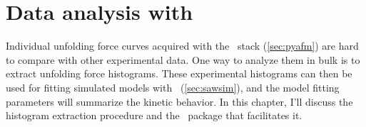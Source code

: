 \chapter{Data analysis with \Hooke}
\label{sec:hooke}

Individual unfolding force curves acquired with the \pyafm\ stack
(\cref{sec:pyafm}) are hard to compare with other experimental data.
One way to analyze them in bulk is to extract unfolding force
histograms.  These experimental histograms can then be used for
fitting simulated models with \sawsim\ (\cref{sec:sawsim}), and the
model fitting parameters will summarize the kinetic behavior.  In this
chapter, I'll discuss the histogram extraction procedure and the
\Hooke\ package that facilitates it.






